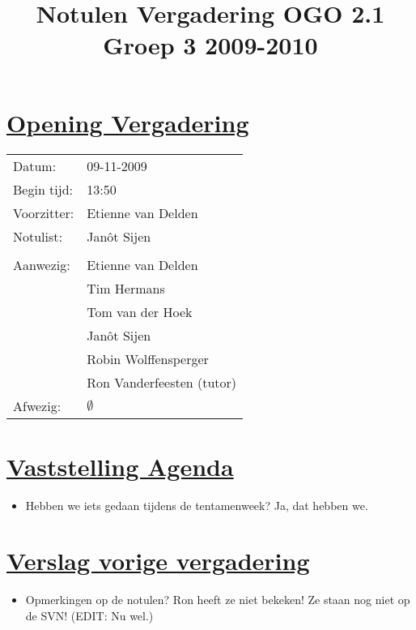 \documentclass[a4paper]{article}
\title{Notulen Vergadering OGO 2.1 Groep 3 2009-2010}
\date{}
\begin{document}
\ifpdf
{}
\else
{}
\fi

\section{\underline{Opening Vergadering}} %
\label{sec:opening_vergadering}
\begin{tabular}{ll}
  Datum:      & 09-11-2009\\
  Begin tijd: & 13:50\\
  Voorzitter: & Etienne van Delden\\
  Notulist:   & Jan\^ot Sijen\\
  & \\
  Aanwezig:   & Etienne van Delden\\
              & Tim Hermans\\
              & Tom van der Hoek\\
              & Jan\^ot Sijen\\
              & Robin Wolffensperger\\
              & Ron Vanderfeesten (tutor)\\
  Afwezig:    & $\emptyset$ \\
\end{tabular}


\section{\underline{Vaststelling Agenda}} %
\label{sec:vaststelling_van_de_agenda}

\begin{itemize}
\item Hebben we iets gedaan tijdens de tentamenweek? Ja, dat hebben we.
\end{itemize}


\section{\underline{Verslag vorige vergadering}} %
\label{sec:bespreking_van_de_vorige_notulen}

\begin{itemize}
\item Opmerkingen op de notulen? Ron heeft ze niet bekeken! Ze staan nog niet op de SVN! (EDIT: Nu wel.)
\end{itemize}
\end{document}
